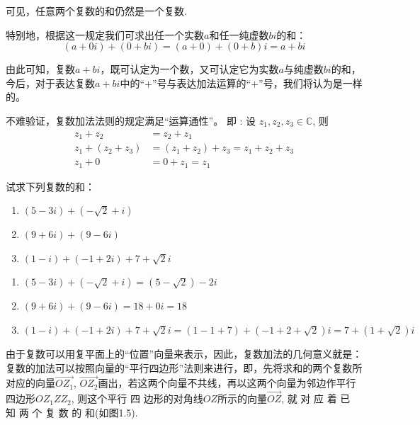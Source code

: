 可见，任意两个复数的和仍然是一个复数.

特别地，根据这一规定我们可求出任一个实数$a$和任一纯虚数$bi$的和：
\[(a+0i)+(0+bi)=(a+0)+(0+b)i=a+bi\]

由此可知，复数$a+bi$，既可认定为一个数，又可认定它为实数$a$与纯虚数$bi$的和，今后，对于表达复数$a+bi$中的“$+$”号与表达加法运算的“$+$”号，我们将认为是一样的。

不难验证，复数加法法则的规定满足“运算通性”。
即 : 设 $z_1, z_2, z_3\in \mathbb{C}$, 则
\begin{align}
    z_{1}+ z_2 &= z_{2}+ z_{1}\tag{交换律成立}\\
    z_{1}+\left( z_{2}+z_{3} \right)&=\left( z_{1}+z_{2} \right)+z_{3}=z_{1}+z_{2}+z_{3}\tag{结合律成立}\\
    z_{1}+ 0&= 0+ z_{1}= z_{1}\tag{零的运算特性保持}
\end{align}

\begin{example}
    试求下列复数的和：
\begin{enumerate}[(1)]
    \item $(5-3i)+(-\sqrt{2}+i)$
    \item $( 9+ 6i) + ( 9- 6i)$
    \item $( 1- i) + ( - 1+ 2i) + 7+ \sqrt {2}i$
\end{enumerate}
\end{example}

\begin{solution}
\begin{enumerate}[(1)]
    \item $( 5- 3i) + ( - \sqrt {2}+ i) = (5- \sqrt {2})-2i$
    \item $( 9+ 6i) + ( 9- 6i) = 18+ 0i= 18$
    \item $( 1- i) + ( - 1+ 2i) +7+ \sqrt {2}i=(1-1+7)+(-1+2+\sqrt{2})i=7+(1+\sqrt{2})i$
\end{enumerate}
\end{solution}


由于复数可以用复平面上的“位置”向量来表示，因此，复数加法的几何意义就是：复数的加法可以按照向量的“平行四边形”法则来进行，即，先将求和的两个复数所对应的向量$\overrightarrow{OZ_{1}}$, $\overrightarrow{OZ_{2}}$画出，若这两个向量不共线，再以这两个向量为邻边作平行四边形$OZ_1ZZ_2$, 则这个平行 四 边形的对角线$OZ$所示的向量$\overrightarrow{OZ}$, 就 对 应 着 已 知 两 个 复 数 的 和(如图1.5).

\begin{figure}[htp]
    \centering
{}
    \caption{}
\end{figure}

